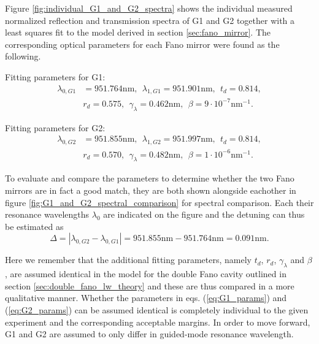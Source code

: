 Figure \ref{fig:individual_G1_and_G2_spectra} shows the individual measured normalized reflection and transmission spectra of G1 and G2 together with a least squares fit to the model derived in section \ref{sec:fano_mirror}. The corresponding optical parameters for each Fano mirror were found as the following.

\newpage
Fitting parameters for G1:
\begin{equation}
    \begin{split}
        \lambda_{0,G1} &= 951.764 \text{nm}, \:\: \lambda_{1,G1} = 951.901 \text{nm},\:\: t_d = 0.814, \\&r_d = 0.575, \:\:  \gamma_{\lambda} = 0.462 \text{nm},\:\: \beta = 9 \cdot 10^{-7} \text{nm}^{-1}.
    \end{split}
    \label{eq:G1_params}
\end{equation}

Fitting parameters for G2:
\begin{equation}
    \begin{split}
        \lambda_{0,G2} &= 951.855 \text{nm}, \:\: \lambda_{1,G2} = 951.997 \text{nm},\:\: t_d = 0.814, \\&r_d = 0.570, \:\:  \gamma_{\lambda} = 0.482 \text{nm},\:\: \beta = 1 \cdot 10^{-6} \text{nm}^{-1}.
    \end{split}
    \label{eq:G2_params}
\end{equation}

To evaluate and compare the parameters to determine whether the two Fano mirrors are in fact a good match, they are both shown alongside eachother in figure \ref{fig:G1_and_G2_spectral_comparison} for spectral comparison. Each their resonance wavelengths $\lambda_0$ are indicated on the figure and the detuning can thus be estimated as 
\begin{equation}
    \Delta = \left|\lambda_{0,G2} - \lambda_{0,G1}\right| = 951.855 \text{nm} - 951.764 \text{nm} = 0.091 \text{nm}.
    \label{eq:G1/G2_detuning}
\end{equation}

Here we remember that the additional fitting parameters, namely $t_d$, $r_d$, $\gamma_{\lambda}$ and $\beta$, are assumed identical in the model for the double Fano cavity outlined in section \ref{sec:double_fano_lw_theory} and these are thus compared in a more qualitative manner. Whether the parameters in eqs. (\ref{eq:G1_params}) and (\ref{eq:G2_params}) can be assumed identical is completely individual to the given experiment and the corresponding acceptable margins. In order to move forward, G1 and G2 are assumed to only differ in guided-mode resonance wavelength.

